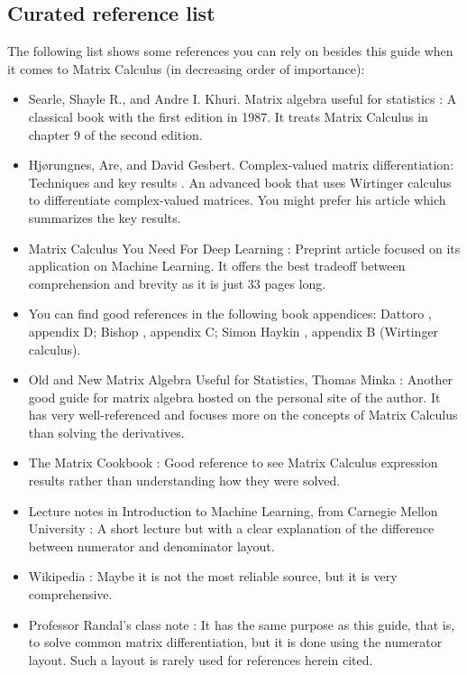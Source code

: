 \documentclass{article}
\begin{document}
\subsection{Curated reference list}
The following list shows some references you can rely on besides this guide when it comes to Matrix Calculus (in decreasing order of importance):
\begin{itemize}
    \item Searle, Shayle R., and Andre I. Khuri. Matrix algebra useful for statistics \cite{searle2017matrix}: A classical book with the first edition in 1987. It treats Matrix Calculus in chapter 9 of the second edition.
    \item Hj\o rungnes, Are, and David Gesbert. Complex-valued matrix differentiation: Techniques and key results \cite{hjorungnes2011complex}. An advanced book that uses Wirtinger calculus to differentiate complex-valued matrices. You might prefer his article \cite{hjorungnes2007complex} which summarizes the key results.
    \item Matrix Calculus You Need For Deep Learning \cite{parrMatrixCalculusYou2018}: Preprint article focused on its application on Machine Learning. It offers the best tradeoff between comprehension and brevity as it is just 33 pages long.
    \item You can find good references in the following book appendices: Dattoro \cite{dattorroConvexOptimizationEuclidean2010}, appendix D; Bishop \cite{bishopPatternRecognitionMachine2006}, appendix C; Simon Haykin \cite{haykin2009neural}, appendix B (Wirtinger calculus).
    \item Old and New Matrix Algebra Useful for Statistics, Thomas Minka \cite{ThomasMinka}: Another good guide for matrix algebra hosted on the personal site of the author. It has very well-referenced and focuses more on the concepts of Matrix Calculus than solving the derivatives.
    \item The Matrix Cookbook \cite{petersen2008matrix}: Good reference to see Matrix Calculus expression results rather than understanding how they were solved.
    \item Lecture notes in Introduction to Machine Learning, from Carnegie Mellon University \cite{Singh}: A short lecture but with a clear explanation of the difference between numerator and denominator layout.
    \item Wikipedia \cite{Matrixca44:online}: Maybe it is not the most reliable source, but it is very comprehensive.
    \item Professor Randal's class note \cite{barnes2006matrix}: It has the same purpose as this guide, that is, to solve common matrix differentiation, but it is done using the numerator layout. Such a layout is rarely used for references herein cited.
\end{itemize}
\end{document}
